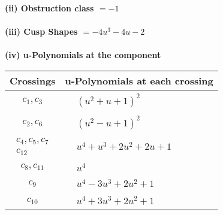 \documentclass[1p]{elsarticle_modified}
\theoremstyle{definition}
\begin{document}
\flushleft \textbf{(ii) Obstruction class $= -1$}\\~\\
\flushleft \textbf{(iii) Cusp Shapes $= -4 u^3-4 u-2$}\\~\\
\newpage\renewcommand{\arraystretch}{1}
\flushleft \textbf{(iv) u-Polynomials at the component}\newline \\
\begin{tabular}{m{50pt}|m{274pt}}
Crossings & \hspace{64pt}u-Polynomials at each crossing \\
\hline $$\begin{aligned}c_{1},c_{3}\end{aligned}$$&$\begin{aligned}
&(u^2+u+1)^2
\end{aligned}$\\
\hline $$\begin{aligned}c_{2},c_{6}\end{aligned}$$&$\begin{aligned}
&(u^2- u+1)^2
\end{aligned}$\\
\hline $$\begin{aligned}c_{4},c_{5},c_{7}\\c_{12}\end{aligned}$$&$\begin{aligned}
&u^4+u^3+2 u^2+2 u+1
\end{aligned}$\\
\hline $$\begin{aligned}c_{8},c_{11}\end{aligned}$$&$\begin{aligned}
&u^4
\end{aligned}$\\
\hline $$\begin{aligned}c_{9}\end{aligned}$$&$\begin{aligned}
&u^4-3 u^3+2 u^2+1
\end{aligned}$\\
\hline $$\begin{aligned}c_{10}\end{aligned}$$&$\begin{aligned}
&u^4+3 u^3+2 u^2+1
\end{aligned}$\\
\hline
\end{tabular}\\~\\
\end{document}

